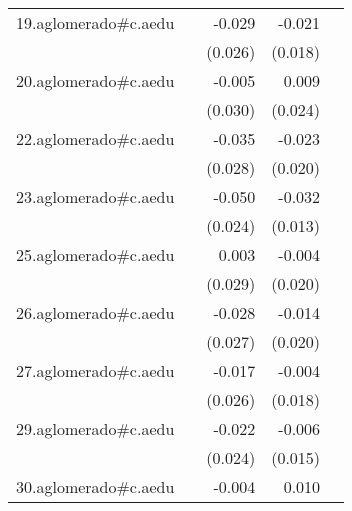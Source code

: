 {\begin{longtable}{l*{4}{D{.}{.}{-1}}}
\addlinespace
19.aglomerado#c.aedu&                     &      -0.029         &      -0.021         &                     \\
            &                     &     (0.026)         &     (0.018)         &                     \\
\addlinespace
20.aglomerado#c.aedu&                     &      -0.005         &       0.009         &                     \\
            &                     &     (0.030)         &     (0.024)         &                     \\
\addlinespace
22.aglomerado#c.aedu&                     &      -0.035         &      -0.023         &                     \\
            &                     &     (0.028)         &     (0.020)         &                     \\
\addlinespace
23.aglomerado#c.aedu&                     &      -0.050\sym{*}  &      -0.032\sym{*}  &                     \\
            &                     &     (0.024)         &     (0.013)         &                     \\
\addlinespace
25.aglomerado#c.aedu&                     &       0.003         &      -0.004         &                     \\
            &                     &     (0.029)         &     (0.020)         &                     \\
\addlinespace
26.aglomerado#c.aedu&                     &      -0.028         &      -0.014         &                     \\
            &                     &     (0.027)         &     (0.020)         &                     \\
\addlinespace
27.aglomerado#c.aedu&                     &      -0.017         &      -0.004         &                     \\
            &                     &     (0.026)         &     (0.018)         &                     \\
\addlinespace
29.aglomerado#c.aedu&                     &      -0.022         &      -0.006         &                     \\
            &                     &     (0.024)         &     (0.015)         &                     \\
\addlinespace
30.aglomerado#c.aedu&                     &      -0.004         &       0.010         &                     \\

\end{longtable}}
